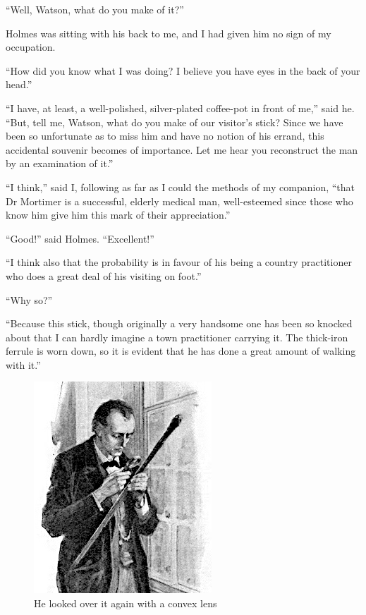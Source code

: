 \documentclass[paper=5.5in:8.5in,BCOR=7mm,twoside,DIV=calc,12pt,usegeometry,openany,chapterprefix,endperiod]{scrbook} %
\begin{document}
\enquote{Well, Watson, what do you make of it?}

Holmes was sitting with his back to me, and I had given him no sign of my occupation.

\enquote{How did you know what I was doing? I believe you have eyes in the back of your head.}

\enquote{I have, at least, a well-polished, silver-plated coffee-pot in front of me,} said he. \enquote{But, tell me, Watson, what do you make of our visitor's stick? Since we have been so unfortunate as to miss him and have no notion of his errand, this accidental souvenir becomes of importance. Let me hear you reconstruct the man by an examination of it.}

\enquote{I think,} said I, following as far as I could the methods of my companion, \enquote{that Dr Mortimer is a successful, elderly medical man, well-esteemed since those who know him give him this mark of their appreciation.}

\enquote{Good!} said Holmes. \enquote{Excellent!}

\enquote{I think also that the probability is in favour of his being a country practitioner who does a great deal of his visiting on foot.}

\enquote{Why so?}

\enquote{Because this stick, though originally a very handsome one has been so knocked about that I can hardly imagine a town practitioner carrying it. The thick-iron ferrule is worn down, so it is evident that he has done a great amount of walking with it.}

\begin{figure}[tbhp]
\centering
\includegraphics[width=0.6\linewidth]{01_convexlensdetail}
\caption{He looked over it again with a convex lens}
\end{figure}
\end{document}
